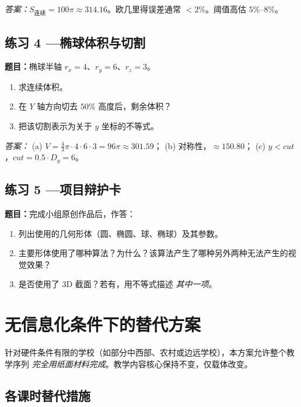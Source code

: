 \documentclass[12pt,a4paper]{scrartcl}
\begin{document}
\emph{答案：}$S_{\text{连续}} = 100\pi \approx 314.16$。欧几里得误差通常 $< 2\%$。阈值高估 $5\%$--$8\%$。

\subsection*{练习 4 ---\quad 椭球体积与切割}
\textbf{题目：}椭球半轴 $r_x = 4$、$r_y = 6$、$r_z = 3$。
\begin{enumerate}[label=\alph*),leftmargin=1.5em,itemsep=0.1em,topsep=0.2em,nosep]
  \item 求连续体积。
  \item 在 $Y$ 轴方向切去 $50\%$ 高度后，剩余体积？
  \item 把该切割表示为关于 $y$ 坐标的不等式。
\end{enumerate}

\emph{答案：}
(a) $V = \tfrac{4}{3}\pi \cdot 4 \cdot 6 \cdot 3 = 96\pi \approx 301.59$；
(b) 对称性，$\approx 150.80$；
(c) $y < \mathit{cut}$，$\mathit{cut} = 0.5 \cdot D_y = 6$。

\subsection*{练习 5 ---\quad 项目辩护卡}
\textbf{题目：}完成小组原创作品后，作答：
\begin{enumerate}[label=(\arabic*),leftmargin=1.7em,itemsep=0.15em,topsep=0.2em,nosep]
  \item 列出使用的几何形体（圆、椭圆、球、椭球）及其参数。
  \item 主要形体使用了哪种算法？为什么？该算法产生了哪种另外两种无法产生的视觉效果？
  \item 是否使用了 3D 截面？若有，用不等式描述 \emph{其中一项}。
\end{enumerate}

\newpage
\section{无信息化条件下的替代方案}\label{ap:adapt}

针对硬件条件有限的学校（如部分中西部、农村或边远学校），本方案允许整个教学序列 \emph{完全用纸面材料完成}。教学内容核心保持不变，仅载体改变。

\subsection{各课时替代措施}
\end{document}
